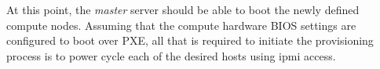 At this point, the {\em master} server should be able to boot the newly defined
compute nodes. Assuming that the compute hardware BIOS settings are configured
to boot over PXE, all that is required to initiate the provisioning process is to power
cycle each of the desired hosts using ipmi access.

